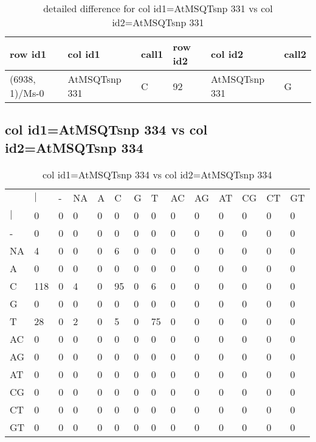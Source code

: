 \begin{center}
\begin{longtable}{|l|l|l|l|l|l|}
\caption{detailed difference for col id1=AtMSQTsnp 331 vs col id2=AtMSQTsnp 331} \label{table_dm867}\\
\hline
row id1&col id1&call1&row id2&col id2&call2\\
\hline
(6938, 1)/Ms-0&AtMSQTsnp 331&C&92&AtMSQTsnp 331&G\\
\hline
\end{longtable}
\end{center}

\subsection{col id1=AtMSQTsnp 334 vs col id2=AtMSQTsnp 334}
\begin{center}
\begin{longtable}{|l|l|l|l|l|l|l|l|l|l|l|l|l|l|}
\caption{col id1=AtMSQTsnp 334 vs col id2=AtMSQTsnp 334} \label{table_dm868}\\
\hline
\\
\hline
&$|$&-&NA&A&C&G&T&AC&AG&AT&CG&CT&GT\\
$|$&0&0&0&0&0&0&0&0&0&0&0&0&0\\
-&0&0&0&0&0&0&0&0&0&0&0&0&0\\
NA&4&0&0&0&6&0&0&0&0&0&0&0&0\\
A&0&0&0&0&0&0&0&0&0&0&0&0&0\\
C&118&0&4&0&95&0&6&0&0&0&0&0&0\\
G&0&0&0&0&0&0&0&0&0&0&0&0&0\\
T&28&0&2&0&5&0&75&0&0&0&0&0&0\\
AC&0&0&0&0&0&0&0&0&0&0&0&0&0\\
AG&0&0&0&0&0&0&0&0&0&0&0&0&0\\
AT&0&0&0&0&0&0&0&0&0&0&0&0&0\\
CG&0&0&0&0&0&0&0&0&0&0&0&0&0\\
CT&0&0&0&0&0&0&0&0&0&0&0&0&0\\
GT&0&0&0&0&0&0&0&0&0&0&0&0&0\\
\hline
\end{longtable}
\end{center}

